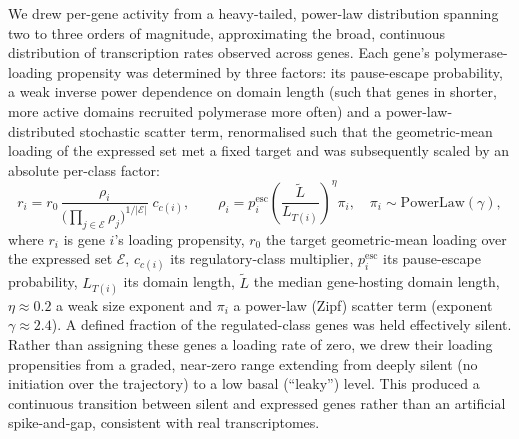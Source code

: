 \documentclass[11pt]{article}
\begin{document}
We drew per-gene activity from a heavy-tailed, power-law distribution spanning two to
three orders of magnitude, approximating the broad, continuous distribution of
transcription rates observed across genes. Each gene's polymerase-loading propensity
was determined by three factors: its pause-escape probability, a weak inverse power
dependence on domain length (such that genes in shorter, more active domains recruited
polymerase more often) and a power-law-distributed stochastic scatter term,
renormalised such that the geometric-mean loading of the expressed set met a fixed
target and was subsequently scaled by an absolute per-class factor:
%
\begin{equation}
r_i = r_0\,\frac{\rho_i}{\big(\prod_{j\in\mathcal{E}}\rho_j\big)^{1/|\mathcal{E}|}}\;c_{c(i)},
\qquad
\rho_i = p^{\mathrm{esc}}_i\left(\frac{\tilde L}{L_{T(i)}}\right)^{\eta}\pi_i,
\quad \pi_i\sim\mathrm{PowerLaw}(\gamma),
\end{equation}
%
where $r_i$ is gene $i$'s loading propensity, $r_0$ the target geometric-mean loading
over the expressed set $\mathcal{E}$, $c_{c(i)}$ its regulatory-class multiplier,
$p^{\mathrm{esc}}_i$ its pause-escape probability, $L_{T(i)}$ its domain length, $\tilde
L$ the median gene-hosting domain length, $\eta\approx0.2$ a weak size exponent and
$\pi_i$ a power-law (Zipf) scatter term (exponent $\gamma\approx2.4$). A defined
fraction of the regulated-class genes was held effectively silent. Rather than
assigning these genes a loading rate of zero, we drew their loading propensities from
a graded, near-zero range extending from deeply silent (no initiation over the
trajectory) to a low basal (``leaky'') level. This produced a continuous transition
between silent and expressed genes rather than an artificial spike-and-gap, consistent
with real transcriptomes.
\end{document}
